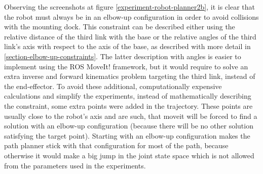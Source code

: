 Observing the screenshots at figure \ref{experiment-robot-planner2b}, it is clear that the robot must always be in an elbow-up configuration in order to avoid collisions with the mounting dock. This constraint can be 
described either using the relative distance of the third link with the base or the relative angles of the third link's axis with respect to the axis of the base, as described with more detail in 
\ref{section-elbow-up-constraints}. The latter description with angles is easier to implement using the ROS MoveIt! framework,  but it would require to solve an extra inverse and forward kinematics problem targeting the third 
link, instead of the end-effector. To avoid these additional, computationally expensive calculations and simplify the experiments, instead of mathematically describing the constraint, 
some extra points were added in the trajectory. 
These points are usually close to the robot's axis and are such, that 
moveit will be forced to find a solution with an elbow-up configuration (because there will be no other solution satisfying the target point). Starting with an elbow-up configuration makes the path planner stick with that 
configuration for most of the path, because otherwise it would make a big jump in the joint state space which is not allowed from the parameters used in the experiments.

